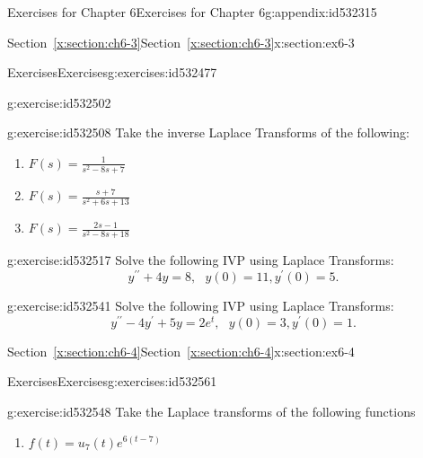 \documentclass[oneside,10pt,]{book}
\newcommand{\xreffont}{\relax}
\numberwithin{equation}{section}
\numberwithin{equation}{section}
\begin{document}
\begin{appendixptx}{Exercises for Chapter 6}{}{Exercises for Chapter 6}{}{}{g:appendix:id532315}
\begin{sectionptx}{Section~{\xreffont\ref*{x:section:ch6-3}}}{}{Section~{\xreffont\ref*{x:section:ch6-3}}}{}{}{x:section:ex6-3}
\begin{exercises-subsection-numberless}{Exercises}{}{Exercises}{}{}{g:exercises:id532477}
\begin{divisionexercise}{1}{}{}{g:exercise:id532502}
\begin{enumerate}[label=(\alph*)]
\end{enumerate}
%
\end{divisionexercise}%
\begin{divisionexercise}{2}{}{}{g:exercise:id532508}%
Take the inverse Laplace Transforms of the following:%
\begin{enumerate}[label=(\alph*)]
\item{}\(\displaystyle F(s)=\frac{1}{s^{2}-8s+7}\)%
\item{}\(\displaystyle F(s)=\frac{s+7}{s^{2}+6s+13}\)%
\item{}\(\displaystyle F(s)=\frac{2s-1}{s^{2}-8s+18}\)%
\end{enumerate}
%
\end{divisionexercise}%
\begin{divisionexercise}{3}{}{}{g:exercise:id532517}%
Solve the following IVP using Laplace Transforms:%
\begin{equation*}
y^{\prime\prime}+4y=8,\,\,\,\,y(0)=11,y^{\prime}(0)=5.
\end{equation*}
%
\end{divisionexercise}%
\begin{divisionexercise}{4}{}{}{g:exercise:id532541}%
Solve the following IVP using Laplace Transforms:%
\begin{equation*}
y^{\prime\prime}-4y^{\prime}+5y=2e^{t},\,\,\,\,y(0)=3,y^{\prime}(0)=1.
\end{equation*}
%
\end{divisionexercise}%
\end{exercises-subsection-numberless}
\end{sectionptx}
%
%
\typeout{************************************************}
\typeout{Section G.4 Section~{\xreffont\ref*{x:section:ch6-4}}}
\typeout{************************************************}
%
\begin{sectionptx}{Section~{\xreffont\ref*{x:section:ch6-4}}}{}{Section~{\xreffont\ref*{x:section:ch6-4}}}{}{}{x:section:ex6-4}
%
%
\typeout{************************************************}
\typeout{************************************************}
%
\begin{exercises-subsection-numberless}{Exercises}{}{Exercises}{}{}{g:exercises:id532561}
\begin{divisionexercise}{1}{}{}{g:exercise:id532548}%
Take the Laplace transforms of the following functions%
\begin{enumerate}[label=(\alph*)]
\item{}\(\displaystyle f(t)=u_{7}(t)e^{6\left(t-7\right)}\)%

\end{enumerate}
\end{divisionexercise}
\end{exercises-subsection-numberless}
\end{sectionptx}
\end{appendixptx}
\end{document}
